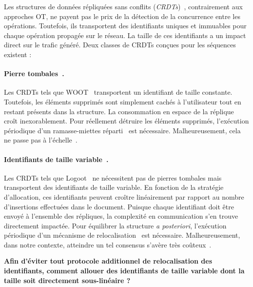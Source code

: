 Les structures de données répliquées sans conflits
(\emph{CRDTs})~\cite{burckhardt2014replicated, shapiro2011comprehensive,
shapiro2011conflict}, contrairement aux approches OT, ne payent pas le prix de
la détection de la concurrence entre les opérations. Toutefois, ils transportent
des identifiants uniques et immuables pour chaque opération propagée sur le
réseau. La taille de ces identifiants a un impact direct sur le trafic généré.
Deux classes de CRDTs conçues pour les séquences existent :

\paragraph{Pierre tombales~\cite{ahmed2011evaluating, attiya2016specification,
conway2014language, grishchenko2010deep, oster2006data, roh2011replicated,
weiss2007wooki, wu2010partial, yu2012stringwise}.} Les CRDTs tels que
WOOT~\cite{oster2006data} transportent un identifiant de taille constante.  
Toutefois, les éléments supprimés sont simplement cachés à l'utilisateur tout en
restant présents dans la structure. La consommation en espace de la réplique
croît inexorablement.
Pour réellement détruire les éléments supprimés, l'exécution périodique d'un
ramasse-miettes réparti~\cite{abdullahi1998garbage} est
nécessaire. Malheureusement, cela ne passe pas à
l'échelle~\cite{abdullahi1998garbage}.

\paragraph{Identifiants de taille variable~\cite{andre2013supporting,
 preguica2009commutative, weiss2009logoot}.} Les CRDTs tels que
Logoot~\cite{weiss2009logoot} ne nécessitent pas de pierres tombales mais
transportent des identifiants de taille variable. En fonction de la stratégie
d'allocation, ces identifiants peuvent croître linéairement par rapport au
nombre d'insertions effectuées dans le document. Puisque chaque identifiant doit
être envoyé à l'ensemble des répliques, la complexité en communication s'en
trouve directement impactée. Pour équilibrer la structure \emph{a posteriori},
l'exécution périodique d'un mécanisme de relocalisation~\cite{letia2009crdts}
est nécessaire. Malheureusement, dans notre contexte, atteindre un tel consensus
s'avère très coûteux~\cite{mostefaoui2015signature}.

\textbf{Afin d'éviter tout protocole additionnel de relocalisation des
identifiants, comment allouer des identifiants de taille variable dont la taille
soit directement sous-linéaire ?}

